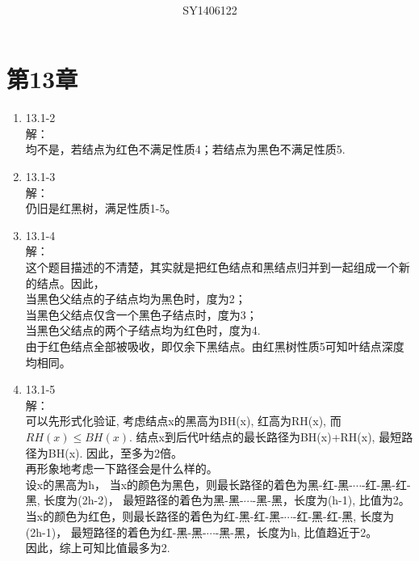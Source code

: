 \documentclass[UTF8]{ctexart}
\begin{document}
\title{\\}
\vspace{2cm}
\author{\\SY1406122}
\date{}
\maketitle

\section*{第13章}
\begin{enumerate}
    \item 13.1-2 \\
    解：\\
        均不是，若结点为红色不满足性质4；若结点为黑色不满足性质5.
		
	\item 13.1-3 \\
	解：\\
		仍旧是红黑树，满足性质1-5。
		
	\item 13.1-4 \\
	解：\\
		这个题目描述的不清楚，其实就是把红色结点和黑结点归并到一起组成一个新的结点。因此，\\
		当黑色父结点的子结点均为黑色时，度为2；	\\
		当黑色父结点仅含一个黑色子结点时，度为3；	\\
		当黑色父结点的两个子结点均为红色时，度为4.	\\
		由于红色结点全部被吸收，即仅余下黑结点。由红黑树性质5可知叶结点深度均相同。
	
	\item 13.1-5 \\
	解：\\
		可以先形式化验证, 考虑结点x的黑高为BH(x), 红高为RH(x), 而$RH(x) \le BH(x)$.
		结点x到后代叶结点的最长路径为BH(x)+RH(x), 最短路径为BH(x). 因此，至多为2倍。\\
		再形象地考虑一下路径会是什么样的。\\
		设x的黑高为h，
		当x的颜色为黑色，则最长路径的着色为黑-红-黑-$\cdots$-红-黑-红-黑, 长度为(2h-2)，
		最短路径的着色为黑-黑-$\cdots$-黑-黑，长度为(h-1), 比值为2。\\
		当x的颜色为红色，则最长路径的着色为红-黑-红-黑-$\cdots$-红-黑-红-黑, 长度为(2h-1)，
		最短路径的着色为红-黑-黑-$\cdots$-黑-黑，长度为h, 比值趋近于2。\\
		因此，综上可知比值最多为2.
		

\end{enumerate}
\end{document}
